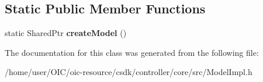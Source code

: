 \subsection*{Static Public Member Functions}
\begin{DoxyCompactItemize}
\item 
\hypertarget{classIntel_1_1CCFL_1_1API_1_1ModelImpl_a11fe1a81c087bdcfccf506a9d0b34b1f}{}static Shared\+Ptr {\bfseries create\+Model} ()\label{classIntel_1_1CCFL_1_1API_1_1ModelImpl_a11fe1a81c087bdcfccf506a9d0b34b1f}

\end{DoxyCompactItemize}


The documentation for this class was generated from the following file\+:\begin{DoxyCompactItemize}
\item 
/home/user/\+O\+I\+C/oic-\/resource/csdk/controller/core/src/Model\+Impl.\+h\end{DoxyCompactItemize}
